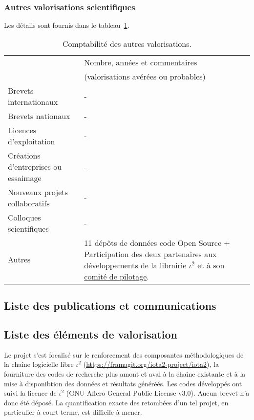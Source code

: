 \subsubsection*{Autres valorisations scientifiques} 
Les détails sont fournis dans le tableau~\ref{tab:valo_other}.
\begin{table}[h!]
\small
    \centering
    \begin{tabular}{|p{6.5cm}|p{7.5cm}|}
    \hline
& Nombre, années et commentaires \\
&(valorisations avérées ou probables)\\\hline
Brevets internationaux &-\\\hline
Brevets nationaux &- \\\hline
Licences d’exploitation&- \\\hline
Créations d’entreprises ou essaimage&- \\\hline
Nouveaux projets collaboratifs & - \\\hline
Colloques scientifiques&- \\\hline
Autres & 11 dépôts de données code Open Source + Participation des deux partenaires aux développements de la librairie $\iota^2$ et à son \href{https://framagit.org/iota2-project/iota2/-/wikis/Project-Steering-Committee}{comité de pilotage}. \\
\hline
    \end{tabular}

    \caption{Comptabilité des autres valorisations.    \label{tab:valo_other}}
\end{table}


\subsection{Liste des publications et communications}

\printbibliography[keyword={LASTIG-CESBIO-j},title={Journaux}]
\printbibliography[keyword={LASTIG-CESBIO-c},title={Conférences}]

\subsection{Liste des éléments de valorisation}
\label{subsec:valo}
Le projet s'est focalisé sur le renforcement des composantes méthodologiques de la chaîne logicielle libre $\iota^2$ (\href{https://framagit.org/iota2-project/iota2}{https://framagit.org/iota2-project/iota2}), la fourniture des codes de recherche plus amont et aval à la chaîne existante et à la mise à disponibtion des données et résultats généréés. Les codes développés ont suivi la licence de $\iota^2$ (GNU Affero General Public License v3.0). Aucun brevet n'a donc été déposé. La quantification exacte des retombées d'un tel projet, en particulier à court terme, est difficile à mener.


